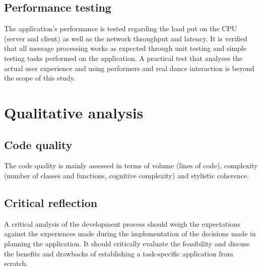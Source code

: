 \subsection{Performance testing}

The application's performance is tested regarding the load put on the \ac{CPU} (server and client) as well as the network throughput and latency.
It is verified that all message processing works as expected through unit testing and simple testing tasks performed on the application.
A practical test that analyses the actual user experience and using performers and real dance interaction is beyond the scope of this study.


\section{Qualitative analysis}
\label{sec:qualitative-analysis}

\subsection{Code quality}

The code quality is mainly assessed in terms of volume (lines of code), complexity (number of classes and functions, cognitive complexity) and stylistic coherence.

\subsection{Critical reflection}

A critical analysis of the development process should weigh the expectations against the experiences made during the implementation of the decisions made in planning the application.
It should critically evaluate the feasibility and discuss the benefits and drawbacks of establishing a task-specific application from scratch.
